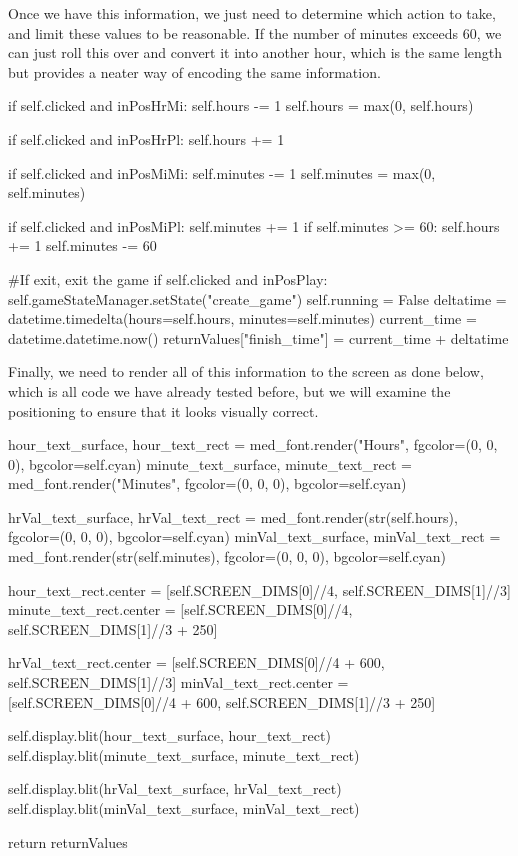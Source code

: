 Once we have this information, we just need to determine which action to take, and limit these values to be reasonable. If the number of minutes exceeds 60, we can just roll this over and convert it into another hour, which is the same length but provides a neater way of encoding the same information.

\begin{mpy}
        if self.clicked and inPosHrMi:
            self.hours -= 1
            self.hours = max(0, self.hours)


        if self.clicked and inPosHrPl:
            self.hours += 1
            

        if self.clicked and inPosMiMi:
            self.minutes -= 1
            self.minutes = max(0, self.minutes)


        if self.clicked and inPosMiPl:
            self.minutes += 1
            if self.minutes >= 60:
                self.hours += 1
                self.minutes -= 60

        #If exit, exit the game
        if self.clicked and inPosPlay:
            self.gameStateManager.setState("create_game")
            self.running = False
            deltatime = datetime.timedelta(hours=self.hours, minutes=self.minutes)
            current_time = datetime.datetime.now()
            returnValues["finish_time"] = current_time + deltatime
\end{mpy}

Finally, we need to render all of this information to the screen as done below, which is all code we have already tested before, but we will examine the positioning to ensure that it looks visually correct.

\begin{mpy}
        hour_text_surface, hour_text_rect = med_font.render("Hours", fgcolor=(0, 0, 0), bgcolor=self.cyan)
        minute_text_surface, minute_text_rect = med_font.render("Minutes", fgcolor=(0, 0, 0), bgcolor=self.cyan)

        hrVal_text_surface, hrVal_text_rect = med_font.render(str(self.hours), fgcolor=(0, 0, 0), bgcolor=self.cyan)
        minVal_text_surface, minVal_text_rect = med_font.render(str(self.minutes), fgcolor=(0, 0, 0), bgcolor=self.cyan)

        hour_text_rect.center = [self.SCREEN_DIMS[0]//4, self.SCREEN_DIMS[1]//3]
        minute_text_rect.center = [self.SCREEN_DIMS[0]//4, self.SCREEN_DIMS[1]//3 + 250]

        hrVal_text_rect.center = [self.SCREEN_DIMS[0]//4 + 600, self.SCREEN_DIMS[1]//3]
        minVal_text_rect.center = [self.SCREEN_DIMS[0]//4 + 600, self.SCREEN_DIMS[1]//3 + 250]

        self.display.blit(hour_text_surface, hour_text_rect)
        self.display.blit(minute_text_surface, minute_text_rect)

        self.display.blit(hrVal_text_surface, hrVal_text_rect)
        self.display.blit(minVal_text_surface, minVal_text_rect)

        return returnValues
\end{mpy}

